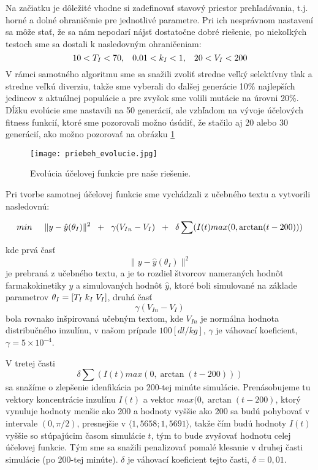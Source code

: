 \documentclass[11pt]{article} %
\begin{document}
Na začiatku je dôležité vhodne si zadefinovať stavový priestor prehľadávania, t.j. horné a dolné ohraničenie pre jednotlivé parametre. Pri ich nesprávnom nastavení sa môže stať, že sa nám nepodarí nájsť dostatočne dobré riešenie, po niekoľkých testoch sme sa dostali k nasledovným ohraničeniam: 
\[ 10 < T_I < 70, \hspace{3mm} 0.01 < k_I < 1, \hspace{3mm} 20 < V_I < 200\] 
V rámci samotného algoritmu sme sa snažili zvoliť stredne veľký selektívny tlak a stredne veľkú diverziu, takže sme vyberali do ďalšej generácie 10\% najlepších jedincov z aktuálnej populácie a pre zvyšok sme volili mutácie na úrovni 20\%. Dĺžku evolúcie sme nastavili na 50 generácií, ale vzhľadom na vývoje účelových fitness funkcií, ktoré sme pozorovali možno úsúdiť, že stačilo aj 20 alebo 30 generácií, ako možno pozorovať na obrázku \ref{fig:moja_evolucia}

\begin{figure}
	\centering
	\texttt{[image: priebeh\_evolucie.jpg]} 
	\caption{Evolúcia účelovej funkcie pre naše riešenie.}
	\label{fig:moja_evolucia}
\end{figure}

Pri tvorbe samotnej účelovej funkcie sme vychádzali z učebného textu a vytvorili nasledovnú:

\begin{equation}
 min \hspace{5mm} \| y - \hat{y}(\theta_I) \|^2 \hspace{2mm}  + \hspace{2mm}  \gamma (V_{In} - V_I) \hspace{2mm}  + \hspace{2mm} \delta \sum(I(t) max(0, \arctan(t-200)))
\end{equation} 

kde prvá časť \[\| y - \hat{y}(\theta_I) \|^2\] je prebraná z učebného textu, a je to rozdiel štvorcov nameraných hodnôt farmakokinetiky $y$ a simulovaných hodnôt $\hat{y}$, ktoré boli simulované na základe parametrov $\theta_I = [T_I \hspace{1mm} k_I \hspace{1mm} V_I]$, druhá časť \[\gamma (V_{In} - V_I)\] bola rovnako inšpirovaná učebným textom, kde $V_{In}$ je normálna hodnota distribučného inzulínu, v našom prípade $100 [dl/kg]$, $\gamma$ je váhovací koeficient, $\gamma = 5 \times 10^{-4}$.

V tretej časti \[\delta \sum(I(t) max(0, \arctan(t-200)))\] sa snažíme o zlepšenie idenfikácia po 200-tej minúte simulácie.
Prenásobujeme tu vektory koncentrácie inzulínu $I(t)$ a vektor $max(0, \arctan(t-200) $, ktorý vynuluje hodnoty menšie ako 200 a hodnoty vyššie ako 200 sa budú pohybovať v intervale $(0,\pi/2)$, presnejšie v $\langle 1,5658;1,5691  \rangle$, takže čím budú hodnoty $I(t)$ vyššie so stúpajúcim časom simulácie $t$, tým to bude zvyšovať hodnotu celej účelovej funkcie. Tým sme sa snažili penalizovať pomalé klesanie v druhej časti simulácie (po 200-tej minúte). $\delta$ je váhovací koeficient tejto časti, $\delta = 0,01$. 
\end{document}
